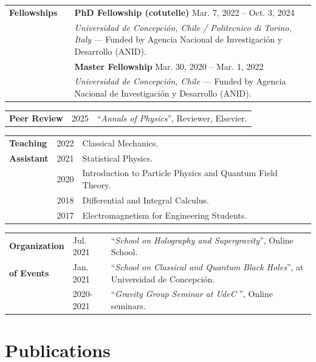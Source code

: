 \documentclass[11pt]{article}
\newenvironment{cvblock}[3]
{
\noindent
\begin{longtable}{p{#1}  >{\raggedright\arraybackslash}p{#2} p{#3}}
}
{
\end{longtable}
}
\newcommand{\cventry}[3]{\textbf{#1} & #2 & #3 \\ }
\newcommand{\event}[2]{\small “\textit{#1}”, #2\vspace{0.2cm}}
\begin{document}
\begin{cvblock}{2.5cm}{0cm}{13cm}
\cventry{Fellowships}{}{\textbf{PhD Fellowship (cotutelle)} \hfill Mar. 7, 2022 – Oct. 3, 2024}
	\cventry{}{}{\textit{Universidad de Concepción, Chile / Politecnico di Torino, Italy} — Funded by Agencia Nacional de Investigación y Desarrollo (ANID).}
\cventry{}{}{\textbf{Master Fellowship} \hfill Mar. 30, 2020 – Mar. 1, 2022}
	\cventry{}{}{\textit{Universidad de Concepción, Chile} — Funded by Agencia Nacional de Investigación y Desarrollo (ANID).}
\end{cvblock}

\begin{cvblock}{2.8cm}{1cm}{13cm}
	\cventry{Peer Review}{\small 2025}{\event{Annals of Physics}{Reviewer, Elsevier.}}
\end{cvblock}

\begin{cvblock}{2.5cm}{2cm}{13cm}
\cventry{Teaching}{\small 2022}{Classical Mechanics.}
	\cventry{Assistant}{\small 2021}{Statistical Physics.}
	\cventry{}{\small 2020}{Introduction to Particle Physics and Quantum Field Theory.}
	\cventry{}{\small 2018}{Differential and Integral Calculus.}
	\cventry{}{\small 2017}{Electromagnetism for Engineering Students.}
\end{cvblock}


\begin{cvblock}{2.5cm}{2cm}{13cm}
	\cventry{Organization}{\small Jul. 2021}{\event{School on Holography and Supergravity}{Online School.}}
	\cventry{of Events}{\small Jan. 2021}{\event{School on Classical and Quantum Black Holes}{at Universidad de Concepción.}}
	\cventry{}{\small 2020-2021}{\event{Gravity Group Seminar at UdeC }{Online seminars.}}
\end{cvblock}



\section*{Publications}
\end{document}
